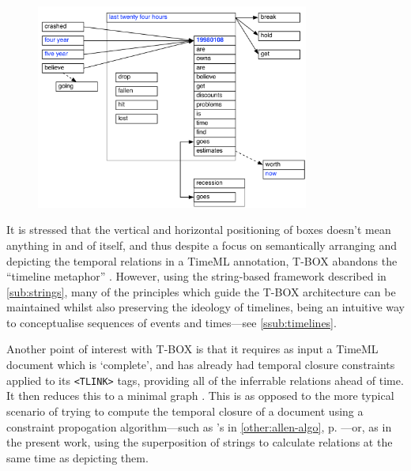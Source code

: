 \documentclass[a4paper,12pt,leqno]{article}
\begin{document}
\begin{center}
	\begin{figure}[h!]
		\centering
		\includegraphics[width=0.8\textwidth]{images/tbox}
		\label{fig:tbox}
	\end{figure}
\end{center}
It is stressed that the vertical and horizontal positioning of boxes doesn't mean anything in and of itself, and thus despite a focus on semantically arranging and depicting the temporal relations in a TimeML annotation, T-BOX abandons the ``timeline metaphor'' \citep{verhagen2005TBOX}. However, using the string-based framework described in \cref{sub:strings}, many of the principles which guide the T-BOX architecture can be maintained whilst also preserving the ideology of timelines, being an intuitive way to conceptualise sequences of events and times---see \cref{ssub:timelines}.

Another point of interest with T-BOX is that it requires as input a TimeML document which is `complete', and has already had temporal closure constraints applied to its \verb|<TLINK>| tags, providing all of the inferrable relations ahead of time. It then reduces this to a minimal graph \citep[p. 6]{verhagen2005TBOX}. This is as opposed to the more typical scenario of trying to compute the temporal closure of a document using a constraint propogation algorithm---such as \citet{allen1983maintaining}'s in \cref{other:allen-algo}, p. \pageref{other:allen-algo}---or, as in the present work, using the superposition of strings to calculate relations at the same time as depicting them.
\end{document}
